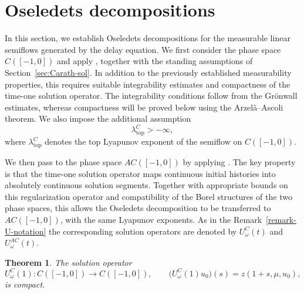\documentclass[reqno]{amsart}
\theoremstyle{plain}
\newtheorem{theorem}{Theorem}[section]
\numberwithin{equation}{section}
\numberwithin{definition}{section}
\begin{document}
\section{Oseledets decompositions}\label{sec:Oseledets}
In this section, we establish Oseledets decompositions for the
measurable linear semiflows generated by the delay equation.
We first consider the phase space $C([-1,0])$ and apply
\cite[Theorem~3.4]{MierczynskiNovoObaya2020}, together with
the standing assumptions of Section~\ref{sec:Carath-sol}.
In addition to the previously established measurability
properties, this requires suitable integrability estimates
and compactness of the time-one solution operator.
The integrability conditions follow from the Gr{\"o}nwall estimates,
whereas compactness will be proved below using the
Arzel\`a--Ascoli theorem. We also impose the additional
assumption
\begin{equation*}
    \lambda_{\mathrm{top}}^C>-\infty,
\end{equation*}
where $\lambda_{\mathrm{top}}^C$ denotes the top Lyapunov
exponent of the semiflow on $C([-1,0])$.

We then pass to the phase space $AC([-1,0])$ by applying
\cite[Theorem~3.6]{Kryspin2024}.
The key property is that the time-one solution operator maps
continuous initial histories into absolutely continuous
solution segments. Together with appropriate bounds on this
regularization operator and compatibility of the Borel
structures of the two phase spaces, this allows the Oseledets
decomposition to be transferred to $AC([-1,0])$, with the
same Lyapunov exponents. As in the Remark~\ref{remark-U-notation} the corresponding solution operators are denoted by
$U_\omega^C(t)$ and $U_\omega^{AC}(t)$.
\begin{theorem}\label{prop:compact-U-C}
The solution operator
\begin{equation*} 
        U^C_\omega(1):C([-1,0])
    \to C([-1,0]),
    \qquad
    \bigl(U^C_\omega(1)u_0\bigr)(s)
    =z(1+s,\mu,u_0),
\end{equation*}
is compact.
\end{theorem}
\end{document}
